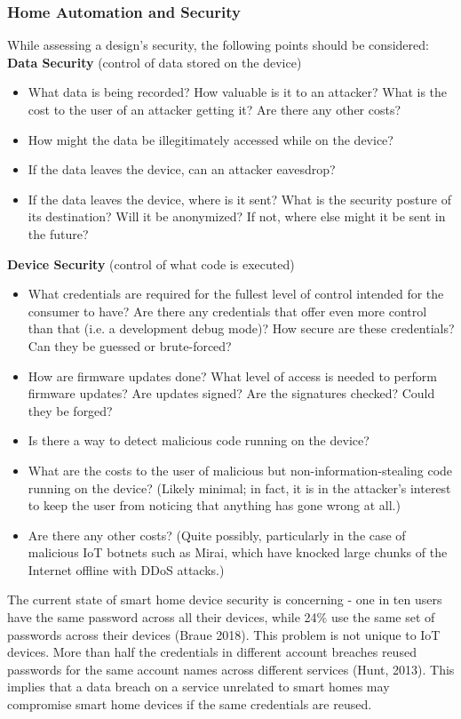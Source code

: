 \subsubsection{Home Automation and Security}
While assessing a design’s security, the following points should be considered:\\

{\bf Data Security} (control of data stored on the device)\\
\begin{itemize}
\item What data is being recorded? How valuable is it to an attacker? What is the cost to the user of an attacker getting it? Are there any other costs?
\item How might the data be illegitimately accessed while on the device?
\item If the data leaves the device, can an attacker eavesdrop?
\item If the data leaves the device, where is it sent? What is the security posture of its destination? Will it be anonymized? If not, where else might it be sent in the future?
\end{itemize}

{\bf Device Security} (control of what code is executed)
\begin{itemize}
\item What credentials are required for the fullest level of control intended for the consumer to have? Are there any credentials that offer even more control than that (i.e. a development debug mode)? How secure are these credentials? Can they be guessed or brute-forced?
\item How are firmware updates done? What level of access is needed to perform firmware updates? Are updates signed? Are the signatures checked? Could they be forged?
\item Is there a way to detect malicious code running on the device?
\item What are the costs to the user of malicious but non-information-stealing code running on the device? (Likely minimal; in fact, it is in the attacker’s interest to keep the user from noticing that anything has gone wrong at all.)
\item Are there any other costs? (Quite possibly, particularly in the case of malicious IoT botnets such as Mirai, which have knocked large chunks of the Internet offline with DDoS attacks.)
\end{itemize}


The current state of smart home device security is concerning - one in ten users have the same password across all their devices, while 24\% use the same set of passwords across their devices (Braue 2018). This problem is not unique to IoT devices. More than half the credentials in different account breaches reused passwords for the same account names across different services (Hunt, 2013). This implies that a data breach on a service unrelated to smart homes may compromise smart home devices if the same credentials are reused.

